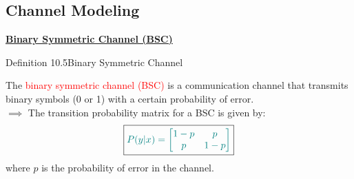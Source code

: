 \documentclass{book}
\begin{document}
\subsection{Channel Modeling}
\uline{\textbf{Binary Symmetric Channel (BSC)}}\\
\begin{defBox}{Definition 10.5}{Binary Symmetric Channel}
    \begin{figure}
    \end{figure}
    The \textcolor{red}{binary symmetric channel (BSC)} is a communication channel that transmits binary symbols (0 or 1) with a certain probability of error.\\
    $\implies$ The transition probability matrix for a BSC is given by:
    \[
        \boxed{\textcolor{teal}{P(y|x) = \begin{bmatrix} 
            1 - p & p \\
            p & 1 - p
        \end{bmatrix}}}
    \]
    where $p$ is the probability of error in the channel.
\end{defBox}
\end{document}
